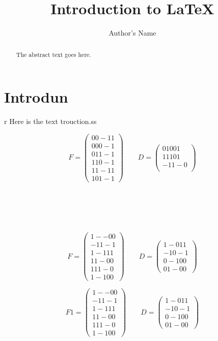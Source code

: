 \documentclass{article}
\begin{document}
    \title{Introduction to \LaTeX{}}
    \author{Author's Name}
    
    \maketitle
    
    \begin{abstract}
    The abstract text goes here.
    \end{abstract}
    
    \section{Introdun}r
    Here is the text trouction.ss
    
    \[
        F = 
    \begin{pmatrix}
        00-11 \\
        000-1 \\
        011-1 \\
        110-1 \\
        11-11 \\
        101-1
    \end{pmatrix}
    \qquad D = 
    \begin{pmatrix}
        01001 \\
        11101 \\
        -11-0 \\
    \end{pmatrix}
    \]
    \\
    \\\\\\\\
    \[
        F = 
    \begin{pmatrix}
        1--00 \\
        -11-1 \\
        1-111 \\
        11-00 \\
        111-0 \\
        1-100
    \end{pmatrix}
    \qquad D = 
    \begin{pmatrix}
        1-011 \\
        -10-1 \\
        0-100 \\
        01-00
    \end{pmatrix}
    \]
    

    \[
        F1  = 
    \begin{pmatrix}
        1--00 \\
        -11-1 \\
        1-111 \\
        11-00 \\
        111-0 \\
        1-100
    \end{pmatrix}
    \qquad D = 
    \begin{pmatrix}
        1-011 \\
        -10-1 \\
        0-100 \\
        01-00
    \end{pmatrix}
    \]

    
    
\end{document}
